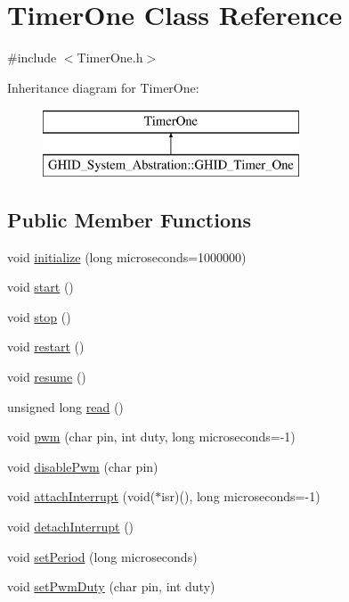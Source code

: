 \hypertarget{class_timer_one}{\section{\-Timer\-One \-Class \-Reference}
\label{class_timer_one}
}


{\ttfamily \#include $<$\-Timer\-One.\-h$>$}

\-Inheritance diagram for \-Timer\-One\-:\begin{figure}[H]
\begin{center}
\leavevmode
\includegraphics[height=2.000000cm]{class_timer_one}
\end{center}
\end{figure}
\subsection*{\-Public \-Member \-Functions}
\begin{DoxyCompactItemize}
\item 
void \hyperlink{class_timer_one_a4690114535a4df72ef92f75585bba67a}{initialize} (long microseconds=1000000)
\item 
void \hyperlink{class_timer_one_ac0bf37ab4c3ac0402b26b0da2efb12e9}{start} ()
\item 
void \hyperlink{class_timer_one_a81e3fdc3ef2e5d3cc3371a6e2f5029c0}{stop} ()
\item 
void \hyperlink{class_timer_one_aac3e2e27328a1b840d659088148c524b}{restart} ()
\item 
void \hyperlink{class_timer_one_a53432448699ed8d47c1bcb3180e7643e}{resume} ()
\item 
unsigned long \hyperlink{class_timer_one_a89045b4d36bda55829b436a1f807e6d8}{read} ()
\item 
void \hyperlink{class_timer_one_a866c9d2c3028ab38b37a0765a9551c96}{pwm} (char pin, int duty, long microseconds=-\/1)
\item 
void \hyperlink{class_timer_one_a54624502206cede8a759dab6bb85a62a}{disable\-Pwm} (char pin)
\item 
void \hyperlink{class_timer_one_abbea146168bb5b541ef3861f806726bd}{attach\-Interrupt} (void($\ast$isr)(), long microseconds=-\/1)
\item 
void \hyperlink{class_timer_one_ab285a795b71c774f8f6cafc0d34b8d08}{detach\-Interrupt} ()
\item 
void \hyperlink{class_timer_one_aea25c60594a08832393f640a24f553bf}{set\-Period} (long microseconds)
\item 
void \hyperlink{class_timer_one_a6818d5048dde7ea9368da519c16caa92}{set\-Pwm\-Duty} (char pin, int duty)
\end{DoxyCompactItemize}
